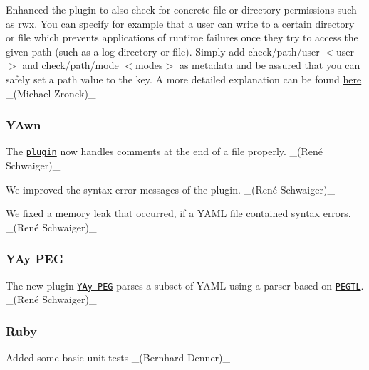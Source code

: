 Enhanced the plugin to also check for concrete file or directory permissions such as {\ttfamily rwx}. You can specify for example that a user can write to a certain directory or file which prevents applications of runtime failures once they try to access the given path (such as a log directory or file). Simply add {\ttfamily check/path/user $<$user$>$} and {\ttfamily check/path/mode $<$modes$>$} as metadata and be assured that you can safely set a path value to the key. A more detailed explanation can be found \hyperlink{md_src_plugins_path_README_src_plugins_path_README_md}{here} \+\_\+(\+Michael Zronek)\+\_\+

\subsubsection*{Y\+Awn}


\begin{DoxyItemize}
\item The \href{https://www.libelektra.org/plugins/yawn}{\tt plugin} now handles comments at the end of a file properly. \+\_\+(René Schwaiger)\+\_\+
\item We improved the syntax error messages of the plugin. \+\_\+(René Schwaiger)\+\_\+
\item We fixed a memory leak that occurred, if a Y\+A\+ML file contained syntax errors. \+\_\+(René Schwaiger)\+\_\+
\end{DoxyItemize}

\subsubsection*{Y\+Ay P\+EG}


\begin{DoxyItemize}
\item The new plugin \href{https://www.libelektra.org/plugins/yaypeg}{\tt Y\+Ay P\+EG} parses a subset of Y\+A\+ML using a parser based on \href{https://github.com/taocpp/PEGTL}{\tt P\+E\+G\+TL}. \+\_\+(René Schwaiger)\+\_\+
\end{DoxyItemize}

\subsubsection*{Ruby}


\begin{DoxyItemize}
\item Added some basic unit tests \+\_\+(\+Bernhard Denner)\+\_\+
\end{DoxyItemize}

